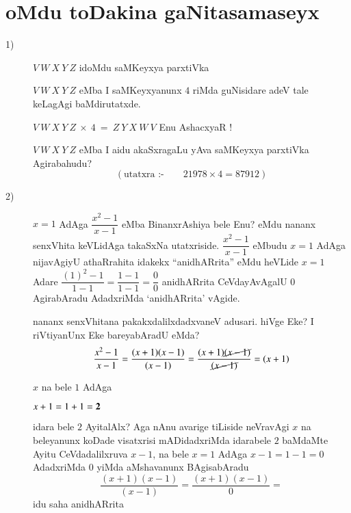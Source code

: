 \chapter{oMdu toDakina gaNitasamaseyx}

\begin{description}
\item[{\rm 1)}] $V ~W ~X ~Y ~Z$ idoMdu saMKeyxya parxtiVka

  $V ~W ~X ~Y ~Z$ eMba I saMKeyxyanunx $4$ riMda guNisidare adeV tale keLagAgi baMdirutatxde.

  $V ~W ~X ~Y ~Z ~ \times ~4 ~= ~Z ~Y~X~W~V$ Enu AshacxyaR !

  $V ~W ~X ~Y ~Z$ eMba I aidu akaSxragaLu yAva saMKeyxya parxtiVka Agirabahudu?
  $$
\left(\text{utatxra :-}\qquad  21978 \times 4 = 87912 \right)
  $$
  
\item[{\rm 2)}] $x=1$ AdAga $\dfrac{x^2-1}{x-1}$ eMba BinanxrAshiya bele Enu? eMdu nananx senxVhita keVLidAga takaSxNa utatxriside. $\dfrac{x^2-1}{x-1}$ eMbudu $x=1$ AdAga nijavAgiyU athaRrahita idakekx ``anidhARrita'' eMdu heVLide $x=1$ Adare $\dfrac{(1)^2 -1}{1-1} = \dfrac{1-1}{1-1} = \dfrac{0}{0}$ anidhARrita CeVdayAvAgalU $0$ AgirabAradu AdadxriMda `anidhARrita' vAgide.

\eject

  nananx senxVhitana pakakxdalilxdadxvaneV adusari. hiVge Eke? I riVtiyanUnx Eke bareyabAradU eMda?
  $$
  \frac{x^2-1}{x-1} = \frac{(x+1)(x-1)}{(x-1)} = \frac{(x+1)\cancel{(x-1)}}{\cancel{(x-1)}} = (x+1)
  $$

  $x$ na bele $1$ AdAga
  
  $x+1 =1+1 ={\bf 2}$ 
  
  idara bele $2$ AyitalAlx? Aga nAnu avarige tiLiside  neVravAgi $x$ na beleyanunx koDade visatxrisi mADidadxriMda idarabele  $2$ baMdaMte Ayitu CeVdadalilxruva $x-1$, na bele $x=1$ AdAga $x-1=1-1=0$ AdadxriMda $0$ yiMda aMshavanunx BAgisabAradu
  $$
  \dfrac{(x+1)(x-1)}{(x-1)} = \dfrac{(x+1)(x-1)}{0} =
  $$
  idu saha anidhARrita
\end{description}
